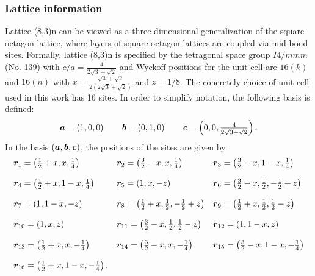 \subsubsection{Lattice information}
%
%
Lattice (8,3)n can be viewed as a three-dimensional generalization of the square-octagon lattice, where layers of square-octagon lattices are coupled via mid-bond sites.
Formally, lattice (8,3)n is specified by the tetragonal space group $I4/mmm$ (No. 139) with $c/a = \frac{4}{2\sqrt{3} + \sqrt{2}}$ and Wyckoff positions for the unit cell are $16(k)$ and $16(n)$ with $x = \frac{\sqrt{3} + \sqrt{2}}{2(2\sqrt{3} + \sqrt{2})}$ and $z=1/8$.
The concretely choice of unit cell used in this work has 16 sites.
In order to simplify notation, the following basis is defined:
%
\begin{equation}
	\begin{matrix*}[l]
		\ba = \left(1, 0, 0\right) \qquad
		\bb = \left(0, 1, 0\right) \qquad
		\bc = \left(0, 0, \frac{4}{2\sqrt{3} + \sqrt{2}}\right).
	\end{matrix*}
\end{equation}
%
In the basis $(\bm{a}, \bm{b}, \bm{c})$, the positions of the sites are given by\pagebreak
%
\begin{equation}
	\begin{matrix*}[l]
		\br_{1} = \left(\frac{1}{2} + x, x, \frac{1}{4} \right) &
		\br_{2} = \left(\frac{3}{2} - x, x, \frac{1}{4} \right) &
		\br_{3} = \left(\frac{3}{2} - x, 1 - x, \frac{1}{4} \right) \\
		&\\
		\br_{4} = \left(\frac{1}{2} + x, 1 - x, \frac{1}{4} \right) &
		\br_{5} = \left(1, x, -z \right) &
		\br_{6} = \left(\frac{3}{2} - x, \frac{1}{2}, -\frac{1}{2} + z \right) \\
		&\\
		\br_{7} = \left(1, 1 - x, -z \right) &
		\br_{8} = \left(\frac{1}{2} + x, \frac{1}{2}, -\frac{1}{2} + z \right) &
		\br_{9} = \left(\frac{1}{2} + x, \frac{1}{2}, \frac{1}{2} - z \right) \\
		&\\
		\br_{10} = \left(1, x, z \right) &
		\br_{11} = \left(\frac{3}{2} - x, \frac{1}{2}, \frac{1}{2} - z \right) &
		\br_{12} = \left(1, 1-x, z \right) \\
		&\\
		\br_{13} = \left(\frac{1}{2} + x, x, -\frac{1}{4} \right) &
		\br_{14} = \left(\frac{3}{2} - x, x, -\frac{1}{4} \right) &
		\br_{15} = \left(\frac{3}{2} -x, 1 - x, -\frac{1}{4} \right) \\
		&\\
		\br_{16} = \left(\frac{1}{2} + x, 1 - x, -\frac{1}{4} \right),
	\end{matrix*}
\end{equation}
